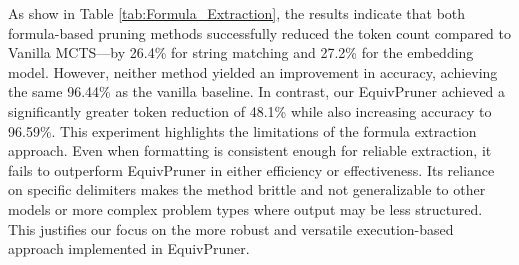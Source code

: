 \documentclass[11pt]{article}
\begin{document}
As show in Table \ref{tab:Formula_Extraction}, the results indicate that both formula-based pruning methods successfully reduced the token count compared to Vanilla MCTS—by 26.4\% for string matching and 27.2\% for the embedding model. However, neither method yielded an improvement in accuracy, achieving the same 96.44\% as the vanilla baseline. In contrast, our EquivPruner achieved a significantly greater token reduction of 48.1\% while also increasing accuracy to 96.59\%.
This experiment highlights the limitations of the formula extraction approach. Even when formatting is consistent enough for reliable extraction, it fails to outperform EquivPruner in either efficiency or effectiveness. Its reliance on specific delimiters makes the method brittle and not generalizable to other models or more complex problem types where output may be less structured. This justifies our focus on the more robust and versatile execution-based approach implemented in EquivPruner.
\end{document}
